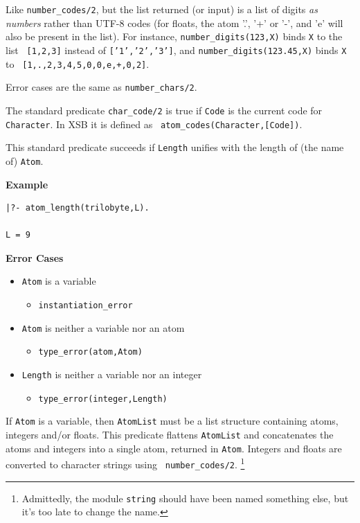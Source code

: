 \begin{description}
Like \verb|number_codes/2|, but the list returned (or input) is a list
of digits \emph{as numbers} rather than UTF-8 codes (for floats, the
atom '.', '+' or '-', and 'e' will also be present in the list). For
instance, \verb|number_digits(123,X)| binds {\tt X} to the list {\tt
  [1,2,3]} instead of {\tt ['1','2','3']}, and
\verb|number_digits(123.45,X)| binds {\tt X} to {\tt
  [1,.,2,3,4,5,0,0,e,+,0,2]}.

Error cases are the same as {\tt number\_chars/2}.

%
The standard predicate {\tt char\_code/2} is true if {\tt Code} is the
current code for {\tt Character}.  In XSB it is defined as {\tt
  atom\_codes(Character,[Code])}.

%
This standard predicate succeeds if {\tt Length} unifies with the
length of (the name of) {\tt Atom}.

{\bf Example}
{\small
\begin{verbatim}
|?- atom_length(trilobyte,L).

L = 9
\end{verbatim}
}

{\bf Error Cases}
\begin{itemize}
  \item {\tt Atom} is a variable
\begin{itemize}
\item {\tt instantiation\_error}
\end{itemize}
\item {\tt Atom} is neither a variable nor an atom
\begin{itemize}      
\item   {\tt type\_error(atom,Atom)}
\end{itemize}
\item {\tt Length} is neither a variable nor an integer
\begin{itemize}      
\item   {\tt type\_error(integer,Length)}
\end{itemize}
\end{itemize}

%
If {\tt Atom} is a variable, then {\tt AtomList} must be a list
structure containing atoms, integers and/or floats.  This predicate
flattens {\tt AtomList} and concatenates the atoms and integers into a
single atom, returned in {\tt Atom}.  Integers and floats are
converted to character strings using {\tt
  number\_codes/2}. \footnote{Admittedly, the module {\tt string}
  should have been named something else, but it's too late to change
  the name.}


\end{description}
